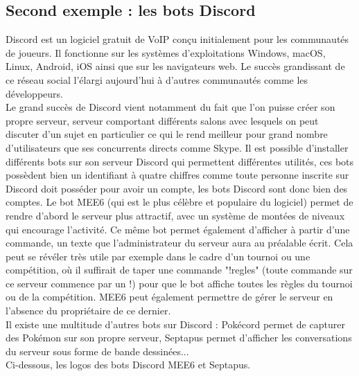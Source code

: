 \documentclass[12pt]{report}
\begin{document}
\newpage
\subsection{Second exemple : les bots Discord}
Discord est un logiciel gratuit de VoIP conçu initialement pour les communautés de joueurs. Il fonctionne sur les systèmes d’exploitations Windows, macOS, Linux, Android, iOS ainsi que sur les navigateurs web. Le succès grandissant de ce réseau social l'élargi aujourd'hui à d'autres communautés comme les développeurs. \\ 

Le grand succès de Discord vient notamment du fait que l'on puisse créer son propre serveur, serveur comportant différents salons avec lesquels on peut discuter d'un sujet en particulier ce qui le rend meilleur pour grand nombre d'utilisateurs que ses concurrents directs comme Skype. Il est possible d'installer différents bots sur son serveur Discord qui permettent différentes utilités, ces bots possèdent bien un identifiant à quatre chiffres comme toute personne inscrite sur Discord doit posséder pour avoir un compte, les bots Discord sont donc bien des comptes. Le bot MEE6 (qui est le plus célèbre et populaire du logiciel) permet de rendre d'abord le serveur plus attractif, avec un système de montées de niveaux qui encourage l'activité. Ce même bot permet également d'afficher à partir d'une commande, un texte que l'administrateur du serveur aura au préalable écrit. Cela peut se révéler très utile par exemple dans le cadre d'un tournoi ou une compétition, où il suffirait de taper une commande "!regles" (toute commande sur ce serveur commence par un !) pour que le bot affiche toutes les règles du tournoi ou de la compétition. MEE6 peut également permettre de gérer le serveur en l'absence du propriétaire de ce dernier. \\

Il existe une multitude d'autres bots sur Discord : Pokécord permet de capturer des Pokémon sur son propre serveur, Septapus permet d'afficher les conversations du serveur sous forme de bande dessinées... \\

Ci-dessous, les logos des bots Discord MEE6 et Septapus. 
\end{document}
